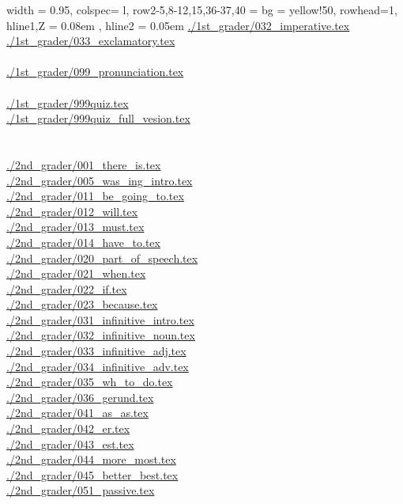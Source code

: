 \documentclass[book,jafontscale=0.9247]{jlreq}
\begin{document}
\begin{longtblr}[caption={Enflish Slides}]{
  width = { 0.95\linewidth },
  colspec= {l},
  row{2-5,8-12,15,36-37,40} = {bg = yellow!50},
  rowhead=1,
  hline{1,Z} = { 0.08em }, %
  hline{2} = { 0.05em } %
}
\url{./1st_grader/032_imperative.tex}\\
\url{./1st_grader/033_exclamatory.tex}\\
\\
\url{./1st_grader/099_pronunciation.tex}\\
\\
\url{./1st_grader/999quiz.tex}\\
\url{./1st_grader/999quiz_full_vesion.tex}\\
\\
\\
\url{./2nd_grader/001_there_is.tex}\\
\url{./2nd_grader/005_was_ing_intro.tex}\\
\url{./2nd_grader/011_be_going_to.tex}\\
\url{./2nd_grader/012_will.tex}\\
\url{./2nd_grader/013_must.tex}\\
\url{./2nd_grader/014_have_to.tex}\\
\url{./2nd_grader/020_part_of_speech.tex}\\
\url{./2nd_grader/021_when.tex}\\
\url{./2nd_grader/022_if.tex}\\
\url{./2nd_grader/023_because.tex}\\
\url{./2nd_grader/031_infinitive_intro.tex}\\
\url{./2nd_grader/032_infinitive_noun.tex}\\
\url{./2nd_grader/033_infinitive_adj.tex}\\
\url{./2nd_grader/034_infinitive_adv.tex}\\
\url{./2nd_grader/035_wh_to_do.tex}\\
\url{./2nd_grader/036_gerund.tex}\\
\url{./2nd_grader/041_as_as.tex}\\
\url{./2nd_grader/042_er.tex}\\
\url{./2nd_grader/043_est.tex}\\
\url{./2nd_grader/044_more_most.tex}\\
\url{./2nd_grader/045_better_best.tex}\\
\url{./2nd_grader/051_passive.tex}\\
\\
\\

\end{longtblr}
\end{document}
